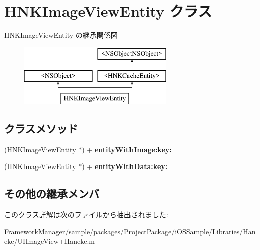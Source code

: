 \hypertarget{interface_h_n_k_image_view_entity}{}\section{H\+N\+K\+Image\+View\+Entity クラス}
\label{interface_h_n_k_image_view_entity}
H\+N\+K\+Image\+View\+Entity の継承関係図\begin{figure}[H]
\begin{center}
\leavevmode
\includegraphics[height=3.000000cm]{interface_h_n_k_image_view_entity}
\end{center}
\end{figure}
\subsection*{クラスメソッド}
\begin{DoxyCompactItemize}
\item 
\hypertarget{interface_h_n_k_image_view_entity_a097a3da4753190aecd8d8341d290544d}{}(\hyperlink{interface_h_n_k_image_view_entity}{H\+N\+K\+Image\+View\+Entity} $\ast$) + {\bfseries entity\+With\+Image\+:key\+:}\label{interface_h_n_k_image_view_entity_a097a3da4753190aecd8d8341d290544d}

\item 
\hypertarget{interface_h_n_k_image_view_entity_a41b80cccc973963dab1ec449078c0a2d}{}(\hyperlink{interface_h_n_k_image_view_entity}{H\+N\+K\+Image\+View\+Entity} $\ast$) + {\bfseries entity\+With\+Data\+:key\+:}\label{interface_h_n_k_image_view_entity_a41b80cccc973963dab1ec449078c0a2d}

\end{DoxyCompactItemize}
\subsection*{その他の継承メンバ}


このクラス詳解は次のファイルから抽出されました\+:\begin{DoxyCompactItemize}
\item 
Framework\+Manager/sample/packages/\+Project\+Package/i\+O\+S\+Sample/\+Libraries/\+Haneke/U\+I\+Image\+View+\+Haneke.\+m\end{DoxyCompactItemize}
